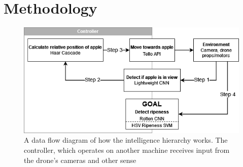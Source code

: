 \section{Methodology}

\begin{figure}[htbp]
    \fontsize{7}{5}\selectfont
    \centering
    \includegraphics[width=\columnwidth,keepaspectratio]
    {./figures/fruit-fly-model-diagram}
    \caption{
        A data flow diagram of how the intelligence hierarchy works.
        The controller, which operates on another machine receives input from the drone's cameras and other sense
    }
    \label{fig:fruit-fly-model-diagram}
\end{figure}





